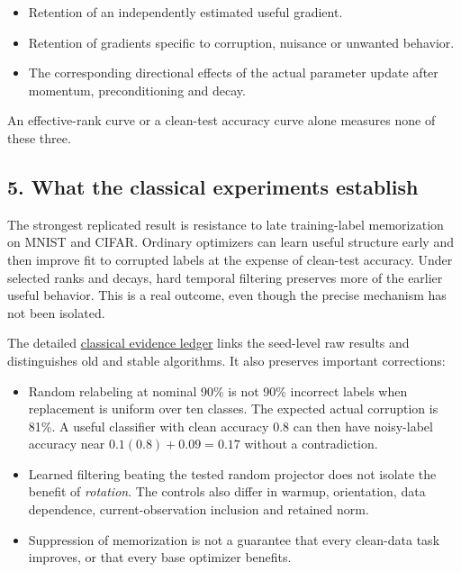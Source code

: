\documentclass[
  british,
  10pt,
  a4paper,
]{article}
\newcounter{none} %
\providecommand{\tightlist}{%
  \setlength{\itemsep}{0pt}\setlength{\parskip}{0pt}}
\begin{document}
\begin{itemize}
\tightlist
\item
  Retention of an independently estimated useful gradient.
\item
  Retention of gradients specific to corruption,\allowbreak{} nuisance
  or unwanted behavior.
\item
  The corresponding directional effects of the actual parameter update
  after momentum, preconditioning and decay.
\end{itemize}

An effective-\allowbreak{}rank curve or a clean-test accuracy curve
alone measures none of these three.

\subsection{5. What the classical experiments
establish}\label{synthesis--what-the-classical-experiments-establish}

The strongest replicated result is resistance to late
training-\allowbreak{}label memorization on MNIST and CIFAR. Ordinary
optimizers can learn useful structure early and then improve fit to
corrupted labels at the expense of clean-test accuracy. Under selected
ranks and decays, hard temporal filtering preserves more of the earlier
useful behavior. This is a real outcome, even though the precise
mechanism has not been isolated.

The detailed \hyperref[classical-evidence]{classical evidence ledger}
links the seed-level raw results and distinguishes old and stable
algorithms.\allowbreak{} It also preserves important corrections:

\begin{itemize}
\tightlist
\item
  Random relabeling at nominal 90\% is not 90\% incorrect labels when
  replacement is uniform over ten classes. The expected actual
  corruption is 81\%. A useful classifier with clean accuracy 0.8 can
  then have noisy-\allowbreak{}label accuracy near
  \(0.1(0.8)+0.09=0.17\) without a
  contradictio\allowbreak{}n.\allowbreak{}
\item
  Learned filtering beating the tested random projector does not isolate
  the benefit of \emph{rotation}. The controls also differ in warmup,
  orientation,\allowbreak{} data dependence,\allowbreak{}
  current-\allowbreak{}observation inclusion and retained norm.
\item
  Suppression of memorization is not a guarantee that every clean-data
  task improves, or that every base optimizer benefits.
\end{itemize}
\end{document}
